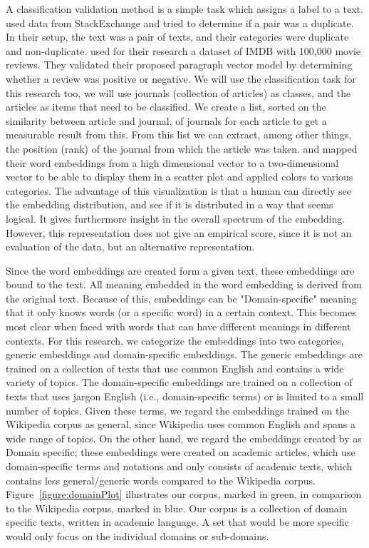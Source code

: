 \documentclass[../../Thesis.tex]{subfiles}
\begin{document}
\begin{jumpin}
A classification validation method is a simple task which assigns a label to a text. \citet{lau2016empirical} used data from StackExchange and tried to determine if a pair was a duplicate. In their setup, the text was a pair of texts, and their categories were duplicate and non-duplicate. \citet{le2014distributed} used for their research a dataset of IMDB with 100,000 movie reviews. They validated their proposed paragraph vector model by determining whether a review was positive or negative. We will use the classification task for this research too, we will use journals (collection of articles) as classes, and the articles as items that need to be classified. We create a list, sorted on the similarity between article and journal, of journals for each article to get a measurable result from this. From this list we can extract, among other things, the position (rank) of the journal from which the article was taken.
\citet{dai2015document} and \citet{hinton2003stochastic} mapped their word embeddings from a high dimensional vector to a two-dimensional vector to be able to display them in a scatter plot and applied colors to various categories. The advantage of this visualization is that a human can directly see the embedding distribution, and see if it is distributed in a way that seems logical. It gives furthermore insight in the overall spectrum of the embedding. However, this representation does not give an empirical score, since it is not an evaluation of the data, but an alternative representation. 
\end{jumpin}
Since the word embeddings are created form a given text, these embeddings are bound to the text. All meaning embedded in the word embedding is derived from the original text. Because of this, embeddings can be "Domain-specific" meaning that it only knows words (or a specific word) in a certain context. This becomes most clear when faced with words that can have different meanings in different contexts. For this research, we categorize the embeddings into two categories, generic embeddings and domain-specific embeddings. The generic embeddings are trained on a collection of texts that use common English and contains a wide variety of topics. The domain-specific embeddings are trained on a collection of texts that uses jargon English (i.e., domain-specific terms) or is limited to a small number of topics. Given these terms, we regard the embeddings trained on the Wikipedia corpus\cite{lai2016generate, pennington2014glove, dai2015document, lau2016empirical, schnabel2015evaluation} as general, since Wikipedia uses common English and spans a wide range of topics. On the other hand, we regard the embeddings created by \citet{Truong2017Thesis} as Domain specific; these embeddings were created on academic articles, which use domain-specific terms and notations and only consists of academic texts, which contains less general/generic words compared to the Wikipedia corpus. Figure~\ref{figure:domainPlot} illustrates our corpus, marked in green, in comparison to the Wikipedia corpus, marked in blue. Our corpus is a collection of domain specific texts, written in academic language. A set that would be more specific would only focus on the individual domains or sub-domains.
\end{document}

